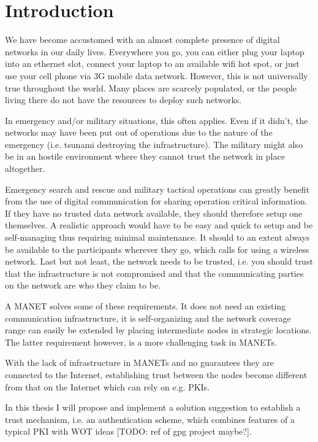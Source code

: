 \chapter{Introduction}
\label{ch:intro}
\acresetall

We have become accustomed with an almost complete presence of digital networks
in our daily lives. Everywhere you go, you can either plug your laptop into an
ethernet slot, connect your laptop to an available wifi hot spot, or just use
your cell phone via 3G mobile data network. However, this is not universally
true throughout the world. Many places are scarcely populated, or the people
living there do not have the resources to deploy such networks.

In emergency and/or military situations, this often applies. Even if it didn't,
the networks may have been put out of operations due to the nature of the
emergency (i.e. tsunami destroying the infrastructure). The military might
also be in an hostile environment where they cannot trust the network in place
altogether.

Emergency search and rescue and military tactical operations can greatly benefit
from the use of digital communication for sharing operation critical
information. If they have no trusted data network available, they should
therefore setup one themselves. A realistic approach would have to be easy and
quick to setup and be self-managing thus requiring minimal maintenance. It
should to an extent always be available to the participants wherever they go,
which calls for using a wireless network. Last but not least, the network needs
to be trusted, i.e. you should trust that the infrastructure is not compromised
and that the communicating parties on the network are who they claim to be.

A \ac{MANET} solves some of these requirements. It does not need an existing
communication infrastructure, it is self-organizing and the network coverage
range can easily be extended by placing intermediate nodes in strategic
locations. The latter requirement however, is a more challenging task in
\acp{MANET}.

With the lack of infrastructure in \acp{MANET} and no guarantees they are
connected to the Internet, establishing trust between the nodes become different
from that on the Internet which can rely on e.g. \acp{PKI}.

In this thesis I will propose and implement a solution suggestion to establish a
trust mechanism, i.e. an authentication scheme, which combines features of a
typical \ac{PKI} with \ac{WOT} ideas [TODO: ref of gpg project maybe?].



